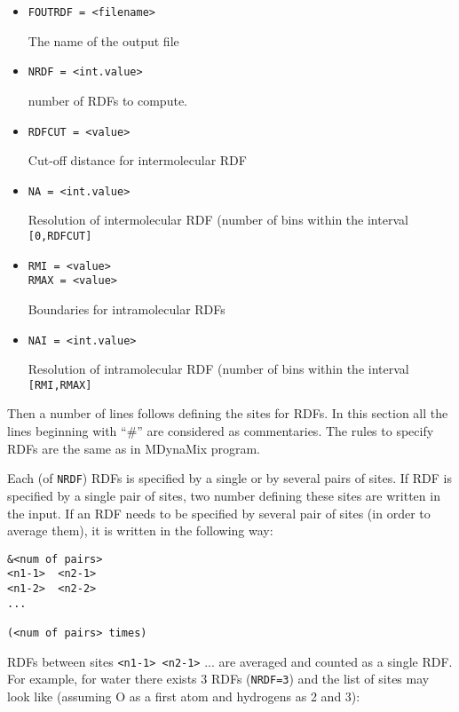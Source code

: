 \documentclass{article}
\begin{document}
\begin{itemize}

\item
\verb|FOUTRDF = <filename>|

The name of the output file

\item
\verb|NRDF = <int.value>|

number of RDFs to compute.

\item
\verb|RDFCUT = <value>|

Cut-off distance for intermolecular RDF

\item
\verb|NA = <int.value>|

Resolution of intermolecular RDF (number of bins within the 
interval \verb|[0,RDFCUT]|

\item
\begin{verbatim}
RMI = <value>
RMAX = <value>
\end{verbatim}

Boundaries for intramolecular RDFs

\item
\verb|NAI = <int.value>|

Resolution of intramolecular RDF (number of bins within the 
interval \verb|[RMI,RMAX]|

\end{itemize}

Then a number of lines follows defining the sites for RDFs. In this section 
all the lines beginning with ``\#'' are considered as commentaries. The
rules to specify RDFs are the same as in MDynaMix program.

Each (of \verb|NRDF|) RDFs is specified by a single or by several pairs of
sites. If RDF is specified by a single pair of sites, two number defining
these sites are written in the input. If an RDF needs to be specified by 
several pair of sites (in order to average them), it is written in the 
following way:

\begin{verbatim} 
&<num of pairs>
<n1-1>  <n2-1>
<n1-2>  <n2-2>
...
 
(<num of pairs> times)
\end{verbatim}

RDFs between sites \verb|<n1-1> <n2-1>| ... are averaged and counted as a
single RDF. For example, for water there exists 3 RDFs (\verb|NRDF=3|) and
the list of sites may look like (assuming O as a first atom and hydrogens
as 2 and 3):
\end{document}
